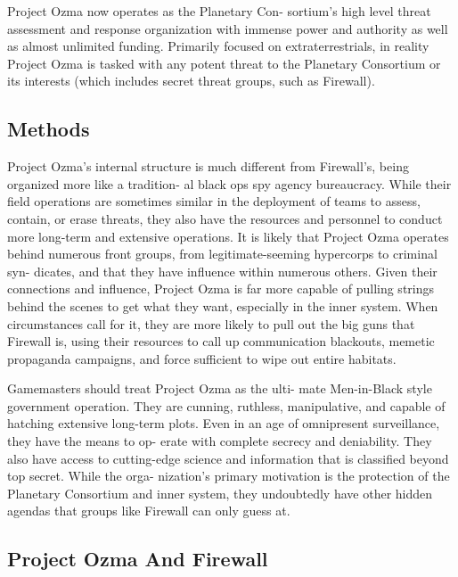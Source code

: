 Project Ozma now operates as the Planetary Con-
sortium's high level threat assessment and response 
organization with immense power and authority as 
well as almost unlimited funding. Primarily focused 
on extraterrestrials, in reality Project Ozma is tasked 
with any potent threat to the Planetary Consortium 
or its interests (which includes secret threat groups, 
such as Firewall). 

\subsection{Methods }

Project Ozma's internal structure is much different 
from Firewall's, being organized more like a tradition-
al black ops spy agency bureaucracy. While their field 
operations are sometimes similar in the deployment 
of teams to assess, contain, or erase threats, they also 
have the resources and personnel to conduct more 
long-term and extensive operations. It is likely that 
Project Ozma operates behind numerous front groups, 
from legitimate-seeming hypercorps to criminal syn-
dicates, and that they have influence within numerous 
others. Given their connections and influence, Project 
Ozma is far more capable of pulling strings behind the 
scenes to get what they want, especially in the inner 
system. When circumstances call for it, they are more 
likely to pull out the big guns that Firewall is, using 
their resources to call up communication blackouts, 
memetic propaganda campaigns, and force sufficient 
to wipe out entire habitats.

Gamemasters should treat Project Ozma as the ulti-
mate Men-in-Black style government operation. They 
are cunning, ruthless, manipulative, and capable of 
hatching extensive long-term plots. Even in an age of 
omnipresent surveillance, they have the means to op-
erate with complete secrecy and deniability. They also 
have access to cutting-edge science and information 
that is classified beyond top secret. While the orga-
nization's primary motivation is the protection of 
the Planetary Consortium and inner system, they 
undoubtedly have other hidden agendas that groups 
like Firewall can only guess at. 

\subsection{Project Ozma And Firewall }

